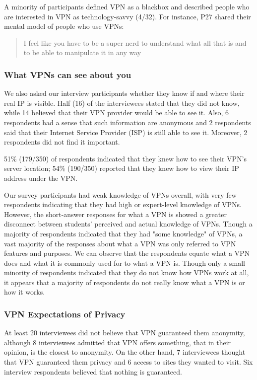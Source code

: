 A minority of participants defined VPN as a blackbox and described people who are
interested in VPN as technology-savvy (4/32). For instance, P27 shared their mental model of
people who use VPNs: \begin{quote}I feel like you have to be a super nerd to  understand what all that is and to be able to manipulate it in any
way\end{quote}





\subsubsection{What VPNs can see about you}
We also asked our interview participants whether they know if and where their
real IP is visible. Half (16) of the interviewees stated that they did not
know, while 14 believed that their VPN provider would be able to see it. Also,
6 respondents had a sense that such information are anonymous and 2
respondents said that their Internet Service Provider (ISP) is still able to
see it. Moreover, 2 respondents did not find it important.

51\% (179/350) of respondents indicated that they knew how to see their
VPN’s server location; 54\% (190/350) reported that they knew how to view
their IP address under the VPN.






Our survey participants had weak knowledge of VPNs overall, with very few
respondents indicating that they had high or expert-level knowledge of VPNs.
However, the short-answer responses for what a VPN is showed a greater
disconnect between students’ perceived and actual knowledge of VPNs. Though a
majority of respondents indicated that they had "some knowledge" of VPNs, a
vast majority of the responses about what a VPN was only referred to VPN
features and purposes. We can observe that the respondents equate what a VPN
does and what it is commonly used for to what a VPN is. Though only a small
minority of respondents indicated that they do not know how VPNs work at all,
it appears that a majority of respondents do not really know what a VPN is or
how it works.


\subsubsection{VPN Expectations of Privacy} At least 20 interviewees did not
believe that VPN guaranteed them anonymity, although 8 interviewees admitted
that VPN offers something, that in their opinion, is the closest to anonymity.
On the other hand, 7 interviewees thought that VPN guaranteed them privacy and
6 access to sites they wanted to visit. Six interview respondents believed
that nothing is guaranteed.

